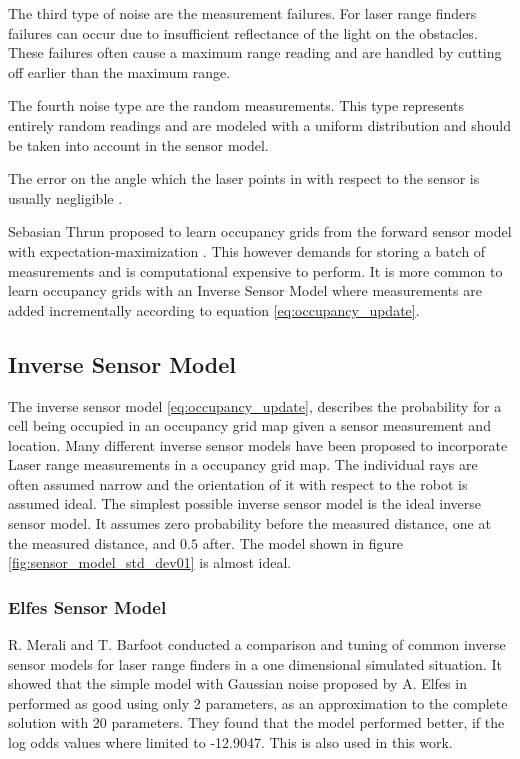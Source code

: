 The third type of noise are the measurement failures. 
For laser range finders failures can occur due to insufficient reflectance of the light on the obstacles. 
These failures often cause a maximum range reading and are handled by cutting off earlier than the maximum range.

The fourth noise type are the random measurements. This type represents entirely random readings and are modeled with a uniform distribution and should be taken into account in the sensor model.

The error on the angle which the laser points in with respect to the sensor is usually negligible \cite{probRob} .


Sebasian Thrun proposed to learn occupancy grids from the forward sensor model with expectation-maximization \cite{probRob}.
This however demands for storing a batch of measurements and is computational expensive to perform. 
It is more common to learn occupancy grids with an Inverse Sensor Model where measurements are added incrementally according to equation \ref{eq:occupancy_update}. 

\subsection{Inverse Sensor Model}
The inverse sensor model \ref{eq:occupancy_update}, describes the probability for a cell being occupied in an occupancy grid map given a sensor measurement and location.
Many different inverse sensor models have been proposed to incorporate Laser range measurements in a occupancy grid map. The individual rays are often assumed narrow and the orientation of it with respect to the robot is assumed ideal.
The simplest possible inverse sensor model is the 
ideal inverse sensor model. It assumes zero probability before the measured distance, one at the measured distance, and $0.5$ after. The model shown in figure \ref{fig:sensor_model_std_dev01} is almost ideal.

\subsubsection{Elfes Sensor Model}
R. Merali and T. Barfoot \cite{sensorModelTuning} conducted a comparison and tuning of common inverse sensor models for laser range finders in a one dimensional simulated situation. It showed that the simple model with Gaussian noise proposed by A. Elfes in \cite{elfes} performed as good using only 2 parameters, as an approximation to the complete solution with 20 parameters. They found that the model performed better, if the log odds values where limited to -12.9047. This is also used in this work.

